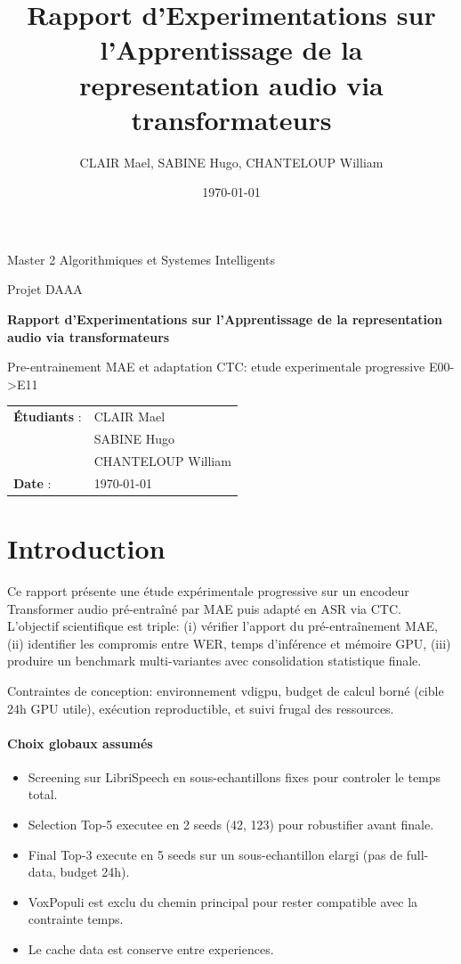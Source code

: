 \documentclass[11pt,a4paper]{article}
\title{Rapport d'Experimentations sur l'Apprentissage de la representation audio via transformateurs}
\author{CLAIR Mael, SABINE Hugo, CHANTELOUP William}
\date{\today}
\begin{document}
\begin{titlepage}
\centering
{\Large Master 2 Algorithmiques et Systemes Intelligents\par}
\vspace{0.35cm}
{\large Projet DAAA\par}
\vspace{1.3cm}
{\LARGE\bfseries Rapport d'Experimentations sur l'Apprentissage de la representation audio via transformateurs\par}
\vspace{0.8cm}
{\large Pre-entrainement MAE et adaptation CTC: etude experimentale progressive E00->E11\par}
\vfill
\begin{tabular}{ll}
\textbf{Étudiants} : & CLAIR Mael \\
 & SABINE Hugo \\
 & CHANTELOUP William \\
\textbf{Date} : & \today \\
\end{tabular}
\vfill
\end{titlepage}

\tableofcontents
\newpage

\section{Introduction}
Ce rapport présente une étude expérimentale progressive sur un encodeur Transformer audio pré-entraîné par MAE puis adapté en ASR via CTC.
L'objectif scientifique est triple: (i) vérifier l'apport du pré-entraînement MAE, (ii) identifier les compromis entre WER, temps d'inférence et mémoire GPU, (iii) produire un benchmark multi-variantes avec consolidation statistique finale.

Contraintes de conception: environnement vdigpu, budget de calcul borné (cible 24h GPU utile), exécution reproductible, et suivi frugal des ressources.

\paragraph{Choix globaux assumés}
\begin{itemize}
\item Screening sur LibriSpeech en sous-echantillons fixes pour controler le temps total.
\item Selection Top-5 executee en 2 seeds (42, 123) pour robustifier avant finale.
\item Final Top-3 execute en 5 seeds sur un sous-echantillon elargi (pas de full-data, budget 24h).
\item VoxPopuli est exclu du chemin principal pour rester compatible avec la contrainte temps.
\item Le cache data est conserve entre experiences.
\end{itemize}
\end{document}
